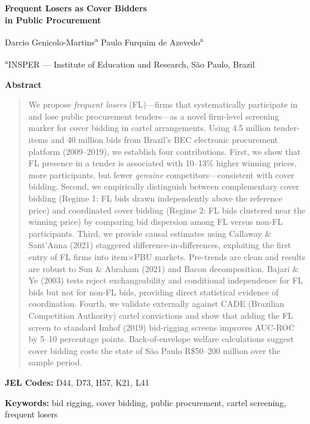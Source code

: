 \documentclass[10pt]{article}
\begin{document}
\begin{titlepage}
\begin{center}
\vspace*{2cm}
{\LARGE \textbf{Frequent Losers as Cover Bidders \\ in Public Procurement}}

\vspace{1.5cm}

{\large Darcio Genicolo-Martins\textsuperscript{a} \quad Paulo Furquim de Azevedo\textsuperscript{a}}

\vspace{0.5cm}

\textsuperscript{a}INSPER --- Institute of Education and Research, S\~{a}o Paulo, Brazil

\vspace{2cm}

\textbf{Abstract}

\end{center}

\begin{quote}
We propose \textit{frequent losers} (FL)---firms that systematically participate in and lose public procurement tenders---as a novel firm-level screening marker for cover bidding in cartel arrangements. Using 4.5 million tender-items and 40 million bids from Brazil's BEC electronic procurement platform (2009--2019), we establish four contributions. First, we show that FL presence in a tender is associated with 10--13\% higher winning prices, more participants, but fewer \textit{genuine} competitors---consistent with cover bidding. Second, we empirically distinguish between complementary cover bidding (Regime 1: FL bids drawn independently above the reference price) and coordinated cover bidding (Regime 2: FL bids clustered near the winning price) by comparing bid dispersion among FL versus non-FL participants. Third, we provide causal estimates using Callaway \& Sant'Anna (2021) staggered difference-in-differences, exploiting the first entry of FL firms into item$\times$PBU markets. Pre-trends are clean and results are robust to Sun \& Abraham (2021) and Bacon decomposition. Bajari \& Ye (2003) tests reject exchangeability and conditional independence for FL bids but not for non-FL bids, providing direct statistical evidence of coordination. Fourth, we validate externally against CADE (Brazilian Competition Authority) cartel convictions and show that adding the FL screen to standard Imhof (2019) bid-rigging screens improves AUC-ROC by 5--10 percentage points. Back-of-envelope welfare calculations suggest cover bidding costs the state of S\~{a}o Paulo R\$50--200 million over the sample period.
\end{quote}

\vspace{1cm}
\noindent \textbf{JEL Codes:} D44, D73, H57, K21, L41

\noindent \textbf{Keywords:} bid rigging, cover bidding, public procurement, cartel screening, frequent losers
\end{titlepage}
\end{document}
